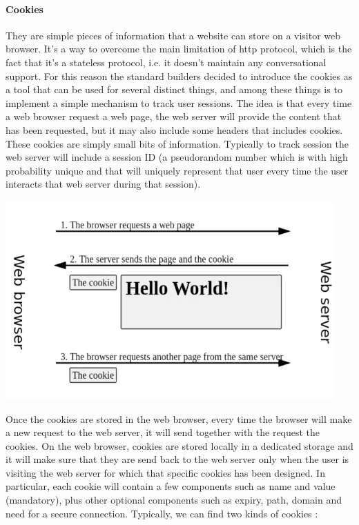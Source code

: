 \paragraph{Cookies} They are simple pieces of information that a website can store on a visitor web browser. It's a way to overcome the main limitation of http protocol, which is the fact that it's a stateless protocol, i.e. it doesn't maintain any conversational support. For this reason the standard builders decided to introduce the cookies as a tool that can be used for several distinct things, and among these things is to implement a simple mechanism to track user sessions. The idea is that every time a web browser request a web page, the web server will provide the content that has been requested, but it may also include some headers that includes cookies. These cookies are simply small bits of information. Typically to track session the web server will include a session ID (a pseudorandom number which is with high probability unique and that will uniquely represent that user every time the user interacts that web server during that session).
\begin{center}
\includegraphics[scale=0.5]{./images/cookies_schema.png}
\end{center}
Once the cookies are stored in the web browser, every time the browser will make a new request to the web server, it will send together with the request the cookies. On the web browser, cookies are stored locally in a dedicated storage and it will make sure that they are send back to the web server only when the user is visiting the web server for which that specific cookies has been designed. In particular, each cookie will contain a few components such as name and value (mandatory), plus other optional components such as expiry, path, domain and need for a secure connection. Typically, we can find two kinds of cookies :

